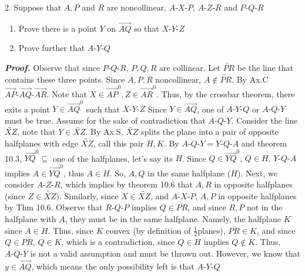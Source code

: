 \documentclass{report}
\begin{document}
    \bigbreak \noindent 
    \begin{mdframed}
        2. Suppose that $A,P$ and $R$ are noncollinear, $ A\text{-}X\text{-}P$, $ A\text{-}Z\text{-}R$ and $ P\text{-}Q\text{-}R $
        \begin{enumerate}[label=(\alph*)]
            \item Prove there is a point $Y$ on $\overrightarrow{AQ}$ so that $ X\text{-}Y\text{-}Z$
            \item Prove further that $ A\text{-}Y\text{-}Q$
        \end{enumerate}
    \end{mdframed}
    \bigbreak \noindent 
    \textbf{\textit{Proof.}} Observe that since $ P\text{-}Q\text{-}R$, $P,Q,R$ are collinear. Let $\overleftrightarrow{PR}$ be the line that contains these three points. Since $A,P,R$ noncollinear, $A \not\in \overleftrightarrow{PR} $. By Ax.C $ \overrightarrow{AP}\text{-}\overrightarrow{AQ}\text{-}\overrightarrow{AR}$. Note that $X \in \overrightarrow{AP}^{0}, Z \in \overrightarrow{AR}^{0}$. Thus, by the crossbar theorem, there exits a point $ Y \in \overrightarrow{AQ}^{0}$ such that $ X\text{-}Y\text{-}Z $
    \bigbreak \noindent 
    Since $Y \in \overrightarrow{AQ}$, one of $ A\text{-}Y\text{-}Q$ or $ A\text{-}Q\text{-}Y$ must be true. Assume for the sake of contradiction that $ A\text{-}Q\text{-}Y$.
    \bigbreak \noindent 
    Consider the line $\overleftrightarrow{XZ}$, note that $Y \in \overleftrightarrow{XZ}$. By Ax.S, $\overleftrightarrow{XZ}$ splits the plane into a pair of opposite halfplanes with edge $\overleftrightarrow{XZ}$, call this pair $H,K$. By $ A\text{-}Q\text{-}Y = Y\text{-}Q\text{-}A$ and theorem 10.3, $\overrightarrow{YQ}^{0} \subseteq $ one of the halfplanes, let's say its $H$. Since $Q \in \overrightarrow{YQ}^{0}$, $Q \in H$. $ Y\text{-}Q\text{-}A$ implies $ A \in \overrightarrow{YQ}^{0}$, thus $A \in H$. So, $A,Q$ in the same halfplane ($H$).
    \bigbreak \noindent 
    Next, we consider $ A\text{-}Z\text{-}R$, which implies by theorem 10.6 that $A,R$ in opposite halfplanes (since $Z \in \overleftrightarrow{XZ}) $. 
    \bigbreak \noindent 
    Similarly, since $X \in \overleftrightarrow{XZ}$, and $ A\text{-}X\text{-}P$, $A,P$ in opposite halfplanes by Thm 10.6. 
    \bigbreak \noindent 
    Observe that $ R\text{-}Q\text{-}P$ implies $Q \in \overline{PR}$, and since $R,P$ not in the halfplane with $A$, they must be in the same halfplane. Namely, the halfplane $K$ since $ A \in H$. Thus, since $K$ convex (by definition of $\frac{1}{2}$planes), $\overline{PR} \in K$, and since $Q \in \overline{PR}$, $Q \in K$, which is a contradiction, since $Q \in H$ implies $Q \not\in K$. Thus, $ A\text{-}Q\text{-}Y$ is not a valid assumption and must be thrown out. However, we know that $y \in \overrightarrow{AQ}$, which means the only possibility left  is that $ A\text{-}Y\text{-}Q$ \endpf
\end{document}

